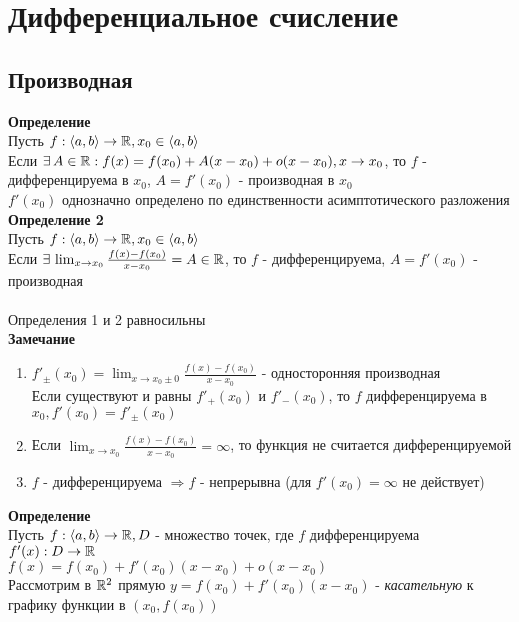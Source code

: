 \documentclass[12pt]{article}
\begin{document}
\section{Дифференциальное счисление}
\subsection{Производная}
\textbf{Определение}\\
Пусть $f: \langle a, b\rangle \rightarrow \mathbb{R}, x_0 \in \langle a, b \rangle$\\
Если $\exists\, A \in \mathbb{R}: f(x) = f(x_0) + A(x-x_0)+o(x-x_0), x\rightarrow x_0$, то $f$ - дифференцируема в $x_0$, $A = f'(x_0)$ - производная в $x_0$\\
$f'(x_0)$ однозначно определено по единственности асимптотического разложения\\
\textbf{Определение 2}\\
Пусть $f: \langle a, b\rangle \rightarrow \mathbb{R}, x_0 \in \langle a, b \rangle$\\
Если $\exists\, \lim_{x\rightarrow x_0} \frac{f(x)-f(x_0)}{x-x_0} = A \in \mathbb{R}$, то $f$ - дифференцируема, $A = f'(x_0)$ - производная\\\\
Определения 1 и 2 равносильны\\
\textbf{Замечание}
\begin{enumerate}
    \item $f'_\pm(x_0) = \lim_{x\rightarrow x_0\pm0} \frac{f(x)-f(x_0)}{x-x_0}$ - односторонняя производная\\
    Если существуют и равны $f'_+(x_0)$ и $f'_-(x_0)$, то $f$ дифференцируема в $x_0, f'(x_0) = f'_\pm(x_0)$
    \item Если $\lim_{x\rightarrow x_0} \frac{f(x)-f(x_0)}{x-x_0} = \infty$, то функция не считается дифференцируемой
    \item $f$ - дифференцируема $\Rightarrow f$ - непрерывна (для $f'(x_0) = \infty$ не действует)
\end{enumerate}
\textbf{Определение}\\
Пусть $f:\langle a, b \rangle \rightarrow \mathbb{R}, D$ - множество точек, где $f$ дифференцируема\\
$f'(x):D\rightarrow \mathbb{R}$\\
$f(x) = f(x_0) + f'(x_0)(x-x_0)+o(x-x_0)$\\
Рассмотрим в $\mathbb{R}^2$ прямую $y=f(x_0)+f'(x_0)(x-x_0)$ - \textit{касательную} к графику функции в $(x_0, f(x_0))$\\
\end{document}
